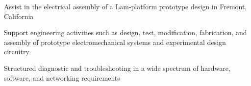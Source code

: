 \begin{tightemize}
    \item Assist in the electrical assembly of a Lam-platform prototype design in Fremont, California
    \item Support engineering activities such as design, test, modification, fabrication, and assembly of prototype electromechanical systems and experimental design circuitry
    \item Structured diagnostic and troubleshooting in a wide spectrum of hardware, software, and networking requirements
\end{tightemize}